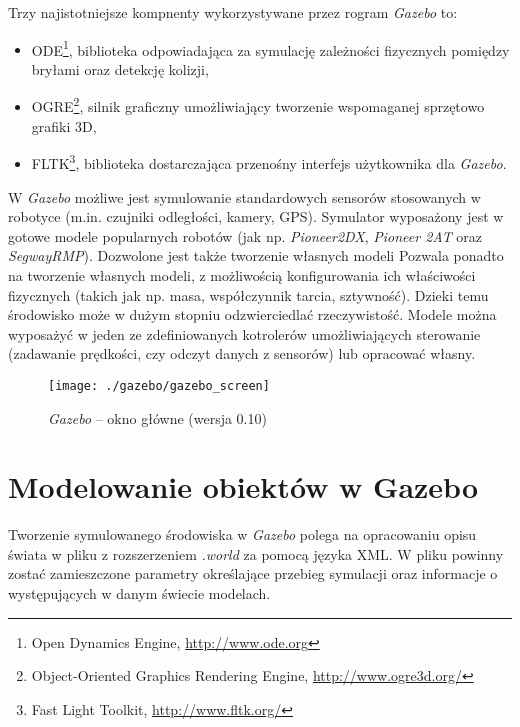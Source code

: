  	Trzy najistotniejsze kompnenty wykorzystywane przez rogram \textit{Gazebo} to:
 	\begin{itemize}
 	 \item ODE\footnote{Open Dynamics Engine, \url{http://www.ode.org}}, biblioteka  odpowiadająca za symulację
 	 	zależności fizycznych pomiędzy bryłami oraz detekcję kolizji,
 	 \item OGRE\footnote{Object-Oriented Graphics Rendering Engine, \url{http://www.ogre3d.org/}}, 
		silnik graficzny umożliwiający tworzenie wspomaganej sprzętowo grafiki 3D,
 	 \item FLTK\footnote{Fast Light Toolkit, \url{http://www.fltk.org/}}, biblioteka dostarczająca 
		przenośny interfejs użytkownika dla \textit{Gazebo}.
 	\end{itemize}

	W \textit{Gazebo} możliwe jest symulowanie standardowych sensorów stosowanych w robotyce (m.in. czujniki odległości, kamery, GPS). Symulator wyposażony jest w gotowe modele 
	popularnych robotów (jak np. \textit{Pioneer2DX}, \textit{Pioneer 2AT} oraz \textit{SegwayRMP}).
	Dozwolone jest także tworzenie własnych modeli
	Pozwala ponadto na tworzenie własnych modeli, z możliwością konfigurowania ich właściwości fizycznych (takich jak np. masa, współczynnik tarcia, sztywność).
	Dzieki temu środowisko może w dużym stopniu odzwierciedlać rzeczywistość. Modele można wyposażyć w jeden ze zdefiniowanych kotrolerów umożliwiających sterowanie (zadawanie prędkości, 
	czy odczyt danych z sensorów) lub opracować własny.
	\begin{figure}[!t]
	\centering
	\label{fig:gazebo}
	\texttt{[image: ./gazebo/gazebo\_screen]}
	\caption{\textit{Gazebo} -- okno główne (wersja 0.10)}
	\end{figure}

	\section{Modelowanie obiektów w Gazebo}
	Tworzenie symulowanego środowiska w \textit{Gazebo} polega na opracowaniu opisu świata w pliku z rozszerzeniem \textit{.world} za pomocą języka XML. W pliku powinny zostać zamieszczone parametry
	określające przebieg symulacji oraz informacje o występujących w danym świecie modelach.
	
